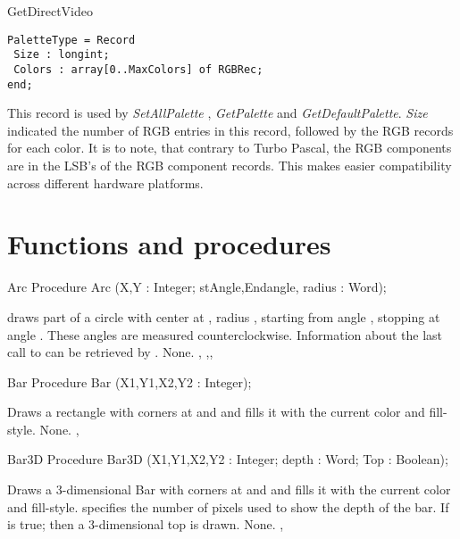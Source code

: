 \begin{function}{GetDirectVideo}
\begin{verbatim}
PaletteType = Record
 Size : longint;
 Colors : array[0..MaxColors] of RGBRec;
end;
\end{verbatim}

This record is used by \textit{SetAllPalette} , \textit{GetPalette} and
\textit{GetDefaultPalette}. \textit{Size} indicated the number of RGB
entries in this record, followed by the RGB records for each color. It
is to note, that contrary to Turbo Pascal, the RGB components are in
the LSB's of the RGB component records. This makes easier compatibility
across different hardware platforms.


\section{Functions and procedures}


\begin{procedure}{Arc}
\Declaration
Procedure Arc (X,Y : Integer; stAngle,Endangle, radius : Word);

\Description
  draws part of a circle with center at , radius
, starting from angle , stopping at angle .
These  angles are measured counterclockwise. Information about the last call
to  can be retrieved by .
\Errors
None.
\SeeAlso
{},
,, 
\end{procedure}

\begin{procedure}{Bar}
\Declaration
Procedure Bar (X1,Y1,X2,Y2 : Integer);

\Description
Draws a rectangle with corners at  and 
and fills it with the current color and fill-style.
\Errors
None.
\SeeAlso
{},
\end{procedure}

\begin{procedure}{Bar3D}
\Declaration
Procedure Bar3D (X1,Y1,X2,Y2 : Integer; depth : Word; Top : Boolean);

\Description
Draws a 3-dimensional Bar  with corners at  and 
and fills it with the current color and fill-style.
 specifies the number of pixels used to show the depth of the
bar.
If  is true; then a 3-dimensional top is drawn.
\Errors
None.
\SeeAlso
{}, 
\end{procedure}


\end{function}
